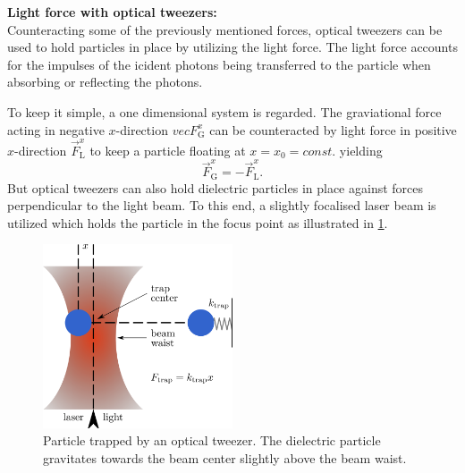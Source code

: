 \documentclass[.../bericht]{subfilies}
\begin{document}
        \textbf{Light force with optical tweezers:}\\
        Counteracting some of the previously mentioned forces, optical tweezers can be used to hold particles in place by utilizing the light force. The light force accounts for the impulses of the icident photons being transferred to the particle when absorbing or reflecting the photons.

        To keep it simple, a one dimensional system is regarded. The graviational force acting in negative $x$-direction $vec{F}_\mathrm{G}^x$ can be counteracted by light force in positive $x$-direction $\vec{F}_\mathrm{L}^x$ to keep a particle floating at $x=x_0=const.$ yielding
        \begin{equation*}
          \vec{F}_\mathrm{G}^x=-\vec{F}_\mathrm{L}^x.
        \end{equation*}
        But optical tweezers can also hold dielectric particles in place against forces perpendicular to the light beam. To this end, a slightly focalised laser beam is utilized which holds the particle in the focus point as illustrated in \ref{fig:tweezer}.

        \begin{figure}[tb]
          \centering
          \includegraphics[width=0.5\textwidth]{figures/opticaltweezer}
          \caption{Particle trapped by an optical tweezer. The dielectric particle gravitates towards the beam center slightly above the beam waist. \cite{wiki:optical-tweezers}}
           \label{fig:tweezer}
        \end{figure}
\end{document}
